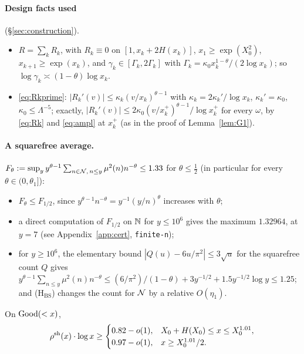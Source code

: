 \paragraph{Design facts used} (\S\ref{sec:construction}).
\begin{itemize}
\item $R=\sum_kR_k$, with $R_k\equiv0$ on $[1,x_k+2H(x_k)]$, $x_1\ge\exp(X_0^2)$, $x_{k+1}\ge\exp(x_k)$, and
  $\gamma_k\in[\Gamma_k,2\Gamma_k]$ with $\Gamma_k=\kappa_0x_k^{1-\theta}/(2\log x_k)$; so $\log\gamma_k\asymp(1-\theta)\log x_k$.
\item \eqref{eq:Rkprime}: $|R_k'(v)|\le\kappa_k(v/x_k)^{\theta-1}$ with $\kappa_k=2\kappa_k'/\log x_k$, $\kappa_k'=\kappa_0$,
  $\kappa_0\le\Lambda^{-5}$; exactly, $|R_k'(v)|\le2\kappa_0(v/x_k^+)^{\theta-1}/\log x_k^+$ for every $\omega$, by \eqref{eq:Rk}
  and \eqref{eq:ampl} at $x_k^+$ (as in the proof of Lemma~\ref{lem:G1}).
\end{itemize}

\paragraph{A squarefree average.} $F_\theta:=\sup_yy^{\theta-1}\sum_{n\in\mathcal{N},\,n\le y}\mu^2(n)n^{-\theta}\le1.33$ for $\theta\le\frac12$
(in particular for every $\theta\in(0,\theta_1]$):
\begin{itemize}
\item $F_\theta\le F_{1/2}$, since $y^{\theta-1}n^{-\theta}=y^{-1}(y/n)^\theta$ increases with $\theta$;
\item a direct computation of $F_{1/2}$ on $\mathbb{N}$ for $y\le10^6$ gives the maximum $1.32964$, at $y=7$ (see
  Appendix~\ref{app:cert}, \texttt{finite-n});
\item for $y\ge10^6$, the elementary bound $|Q(u)-6u/\pi^2|\le3\sqrt u$ for the squarefree count $Q$ gives
  $y^{\theta-1}\sum_{n\le y}\mu^2(n)n^{-\theta}\le(6/\pi^2)/(1-\theta)+3y^{-1/2}+1.5y^{-1/2}\log y\le1.25$; and
  \textup{(H$_{\mathrm{BS}}$)} changes the count for $\mathcal{N}$ by a relative $O(\eta_1)$.
\end{itemize}

\begin{proposition}\label{prop:g1}
On $\mathrm{Good}(<x)$,
\[
  \rho^{\mathrm{sh}}(x)\cdot\log x\ge
  \begin{cases}
    0.82-o(1), & X_0+H(X_0)\le x\le X_0^{1.01},\\
    0.97-o(1), & x\ge X_0^{1.01}/2.
  \end{cases}
\]
\end{proposition}

